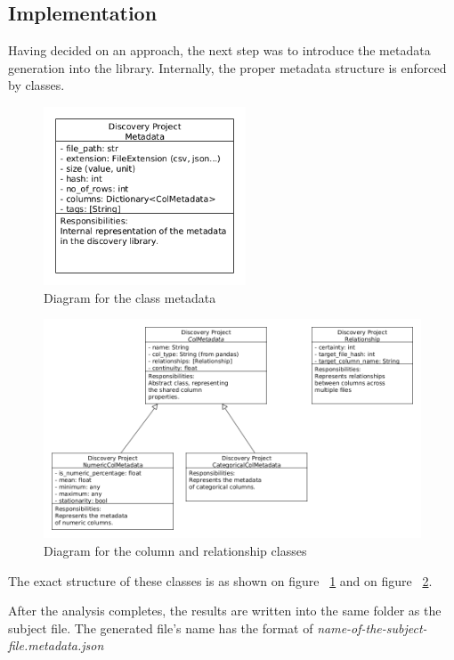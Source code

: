 \subsection{Implementation}

Having decided on an approach, the next step was to introduce the metadata generation into the library.
Internally, the proper metadata structure is enforced by classes.

\begin{figure}[H]
    \centering
    \includegraphics[width=6cm]{figures/metadata/metadata_class}
    \caption{Diagram for the class metadata}
    \label{fig:metadata_fig_1}
\end{figure}



\begin{figure}[H]
    \centering
    \includegraphics[width=12cm]{figures/metadata/col_rel_class}
    \caption{Diagram for the column and relationship classes}
    \label{fig:metadata_fig_2}
\end{figure}

The exact structure of these classes is as shown on figure ~\ref{fig:metadata_fig_1} and on figure ~\ref{fig:metadata_fig_2}.

After the analysis completes, the results are written into the same folder as the subject file.
The generated file's name has the format of \textit{name-of-the-subject-file.metadata.json}

